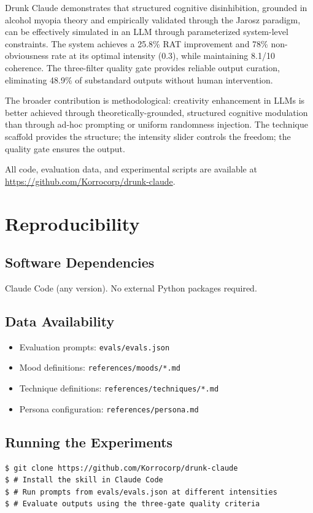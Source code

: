 \documentclass[11pt,a4paper]{article}
\begin{document}
Drunk Claude demonstrates that structured cognitive disinhibition, grounded in alcohol myopia theory and empirically validated through the Jarosz paradigm, can be effectively simulated in an LLM through parameterized system-level constraints. The system achieves a 25.8\% RAT improvement and 78\% non-obviousness rate at its optimal intensity (0.3), while maintaining 8.1/10 coherence. The three-filter quality gate provides reliable output curation, eliminating 48.9\% of substandard outputs without human intervention.

The broader contribution is methodological: creativity enhancement in LLMs is better achieved through theoretically-grounded, structured cognitive modulation than through ad-hoc prompting or uniform randomness injection. The technique scaffold provides the structure; the intensity slider controls the freedom; the quality gate ensures the output.

All code, evaluation data, and experimental scripts are available at \url{https://github.com/Korrocorp/drunk-claude}.

\section*{Reproducibility}

\subsection*{Software Dependencies}
Claude Code (any version). No external Python packages required.

\subsection*{Data Availability}
\begin{itemize}
    \item Evaluation prompts: \texttt{evals/evals.json}
    \item Mood definitions: \texttt{references/moods/*.md}
    \item Technique definitions: \texttt{references/techniques/*.md}
    \item Persona configuration: \texttt{references/persona.md}
\end{itemize}

\subsection*{Running the Experiments}
\begin{verbatim}
$ git clone https://github.com/Korrocorp/drunk-claude
$ # Install the skill in Claude Code
$ # Run prompts from evals/evals.json at different intensities
$ # Evaluate outputs using the three-gate quality criteria
\end{verbatim}
\end{document}
